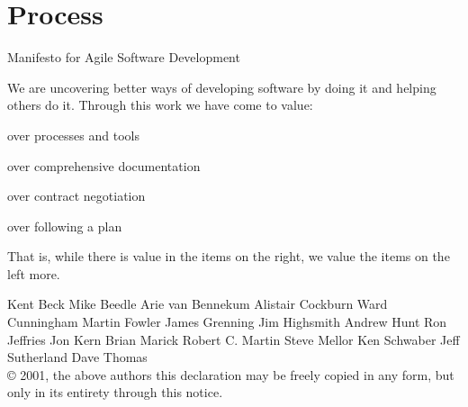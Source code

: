 \documentclass[14pt]{beamer}
\begin{document}
  \section{Process}
    \blankscreen{}
    \begin{frame}{\large Manifesto for Agile Software Development}

      {\footnotesize \color{black} We are uncovering better ways of developing
      software by doing it and helping others do it.
      Through this work we have come to value:}
      \vfill
      \begin{description}
        \begin{small}
          \item [Individuals and interactions] over processes and tools
          \item [Working software] over comprehensive documentation
          \item [Customer collaboration] over contract negotiation
          \item [Responding to change] over following a plan
        \end{small}
      \end{description}
      \vfill
      {\footnotesize That is, while there is value in the items on
      the right, we value the items on the left more.}

      \begin{block}{}
        {\tiny
          Kent Beck\hspace{5pt}
          Mike Beedle\hspace{5pt}
          Arie van Bennekum\hspace{5pt}
          Alistair Cockburn\hspace{5pt}
          Ward Cunningham\hspace{5pt}
          Martin Fowler\hspace{5pt}
          James Grenning\hspace{5pt}
          Jim Highsmith\hspace{5pt}
          Andrew Hunt\hspace{5pt}
          Ron Jeffries\hspace{5pt}
          Jon Kern\hspace{5pt}
          Brian Marick\hspace{5pt}
          Robert C. Martin\hspace{5pt}
          Steve Mellor\hspace{5pt}
          Ken Schwaber\hspace{5pt}
          Jeff Sutherland\hspace{5pt}
          Dave Thomas\\
          © 2001, the above authors
          this declaration may be freely copied in any form, but only in its entirety through this notice.}
      \end{block}

    \end{frame}
\end{document}
